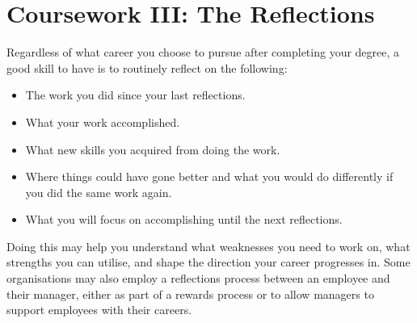 
\section{Coursework III: The Reflections}

Regardless of what career you choose to pursue after completing your degree, a good skill to have is to routinely reflect on the following:

\begin{itemize}
    \item The work you did since your last reflections.
    \item What your work accomplished.
    \item What new skills you acquired from doing the work.
    \item Where things could have gone better and what you would do differently if you did the same work again.
    \item What you will focus on accomplishing until the next reflections.
\end{itemize}

Doing this may help you understand what weaknesses you need to work on, what strengths you can utilise, and shape the direction your career progresses in. Some organisations may also employ a reflections process between an employee and their manager, either as part of a rewards process or to allow managers to support employees with their careers.
